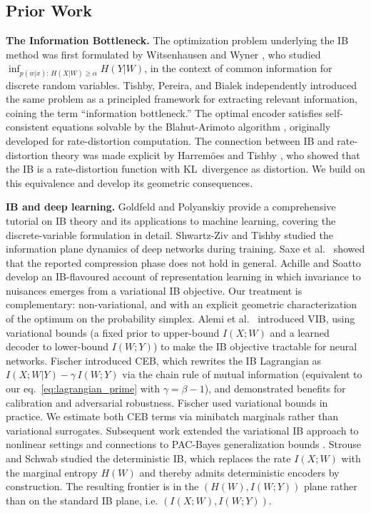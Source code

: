 \documentclass[11pt]{article}
\begin{document}
\subsection{Prior Work}

\medskip
\noindent\textbf{The Information Bottleneck.}
The optimization problem underlying the IB method was first
formulated by Witsenhausen and Wyner
\cite{witsenhausen1975conditional}, who studied
$\inf_{p(w|x):\,H(X|W)\geq\alpha}H(Y|W)$, in the context of common
information \cite{gacs1973common} for discrete random
variables.
Tishby, Pereira, and Bialek \cite{tishby1999information}
independently introduced the same problem as a principled framework
for extracting relevant information, coining the term ``information
bottleneck.''
The optimal encoder satisfies self-consistent equations solvable by
the Blahut-Arimoto algorithm \cite{blahut1972computation,
arimoto1972algorithm}, originally developed for rate-distortion
computation.
The connection between IB and rate-distortion theory was made explicit
by Harrem\"oes and Tishby \cite{harremoes2007information}, who showed
that the IB is a rate-distortion function with KL~divergence as
distortion. We build on this equivalence and develop its geometric
consequences.

\medskip
\noindent\textbf{IB and deep learning.}
Goldfeld and Polyanskiy \cite{goldfeld2020information} provide a
comprehensive tutorial on IB theory and its applications to machine
learning, covering the discrete-variable formulation in detail.
Shwartz-Ziv and Tishby \cite{shwartzziv2017opening} studied the
information plane dynamics of deep networks during training.
Saxe et al.\ \cite{saxe2018information} showed that the reported
compression phase does not hold in general.
Achille and Soatto \cite{achille2018emergence} develop an IB-flavoured
account of representation learning in which invariance to nuisances
emerges from a variational IB objective. Our treatment is
complementary: non-variational, and with an explicit geometric
characterization of the optimum on the probability simplex.
Alemi et al.\ \cite{alemi2017deep} introduced VIB, using variational
bounds (a fixed prior to upper-bound $I(X;W)$ and a learned
decoder to lower-bound $I(W;Y)$) to make the IB objective tractable
for neural networks.
Fischer \cite{fischer2020conditional} introduced CEB, which rewrites
the IB Lagrangian as
$I(X;W|Y)-\gamma\,I(W;Y)$ via the chain rule of mutual information
(equivalent to our eq.~\eqref{eq:lagrangian_prime} with
$\gamma=\beta-1$), and demonstrated benefits for calibration and
adversarial robustness.
Fischer used variational bounds in practice. We estimate both CEB
terms via minibatch marginals rather than variational surrogates.
Subsequent work extended the variational IB approach to nonlinear
settings \cite{kolchinsky2019nonlinear} and connections to PAC-Bayes
generalization bounds \cite{xu2017information}.
Strouse and Schwab \cite{strouse2017deterministic} studied the
deterministic IB, which replaces the rate $I(X;W)$ with the marginal
entropy $H(W)$ and thereby admits deterministic encoders by
construction. The resulting frontier is in the $(H(W),I(W;Y))$ plane
rather than on the standard IB plane, i.e. $(I(X;W),I(W;Y))$.
\end{document}
